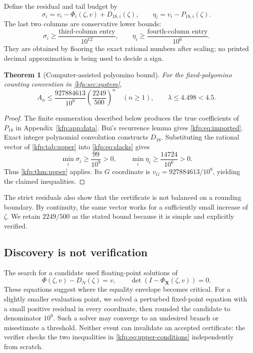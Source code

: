\documentclass[11pt,a4paper]{article}
\newtheorem{theorem}{Theorem}[section]
\theoremstyle{definition}
\theoremstyle{remark}
\newcommand{\bX}{\boldsymbol X}
\begin{document}
Define the residual and tail budget by
\begin{equation}\label{kfp:eq:slacks}
 \sigma_i=v_i-\Phi_i(\zeta,v)+D_{18,i}(\zeta),\qquad
 \eta_i=v_i-P_{18,i}(\zeta).
\end{equation}
The last two columns are conservative lower bounds:
\[
 \sigma_i\geq\frac{\text{third-column entry}}{10^{12}},\qquad
 \eta_i\geq\frac{\text{fourth-column entry}}{10^6}.
\]
They are obtained by flooring the exact rational numbers after scaling;
no printed decimal approximation is being used to decide a sign.

\begin{table}[htbp]
\centering\small

\caption{The rational size-$18$ upper certificate and exact lower bounds on
its margins. All vector entries have denominator $10^9$.}
\label{kfp:tab:upper}
\end{table}

\begin{theorem}[Computer-assisted polyomino bound]\label{kfp:thm:main}
For the fixed-polyomino counting convention in \cref{kfp:sec:system},
\[
 A_n\leq\frac{927884613}{10^9}
          \left(\frac{2249}{500}\right)^n\quad(n\geq1),
 \qquad \lambda\leq4.498<4.5.
\]
\end{theorem}
\begin{proof}
The finite enumeration described below produces the true coefficients of
$P_{18}$ in Appendix~\ref{kfp:app:data}. Bui's recurrence lemma gives
\eqref{kfp:eq:imported}. Exact integer polynomial convolution constructs $D_{18}$.
Substituting the rational vector of \cref{kfp:tab:upper} into
\eqref{kfp:eq:slacks} gives
\[
 \min_i\sigma_i\geq\frac{99}{10^9}>0,\qquad
 \min_i\eta_i\geq\frac{14724}{10^6}>0.
\]
Thus \cref{kfp:thm:upper} applies. Its $G$ coordinate is
$v_G=927884613/10^9$, yielding the claimed inequalities.
\end{proof}

The strict residuals also show that the certificate is not balanced on a
rounding boundary. By continuity, the same vector works for a sufficiently
small increase of $\zeta$. We retain $2249/500$ as the stated bound because
it is simple and explicitly verified.

\subsection{Discovery is not verification}
The search for a candidate used floating-point solutions of
\[
 \Phi(\zeta,v)-D_N(\zeta)=v,
 \qquad \det(I-\Phi_{\bX}(\zeta,v))=0.
\]
These equations suggest where the equality envelope becomes critical.
For a slightly smaller evaluation point, we solved a perturbed fixed-point
equation with a small positive residual in every coordinate, then rounded the
candidate to denominator $10^9$. Such a solver may converge to an undesired
branch or misestimate a threshold. Neither event can invalidate an accepted
certificate: the verifier checks the two inequalities in
\eqref{kfp:eq:upper-conditions} independently from scratch.
\end{document}
